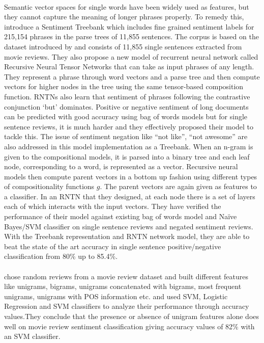\documentclass[a4paper,26pt]{article}
\begin{document}
\paragraph{}
Semantic vector spaces for single words have been widely used as features, but they cannot capture the meaning of longer phrases properly. To remedy this, \cite{socher2013recursive} introduce a Sentiment Treebank which includes fine grained sentiment labels for 215,154 phrases in the parse trees of 11,855 sentences. The corpus is based on the dataset introduced by \cite{pang2005seeing} and consists of 11,855 single sentences extracted from movie reviews. They also propose a new model of recurrent neural network called Recursive Neural Tensor Networks that can take as input phrases of any length. They represent a phrase through word vectors and a parse tree and then compute vectors for higher nodes in the tree using the same tensor-based composition function. RNTNs also learn that sentiment of phrases following the contrastive conjunction ‘but’ dominates. Positive or negative sentiment of long documents can be predicted with good accuracy using bag of words models but for single sentence reviews, it is much harder and they effectively proposed their model to tackle this. The issue of sentiment negation like ``not like'', ``not awesome'' are also addressed in this model implementation as a Treebank. When an n-gram is given to the compositional models, it is parsed into a binary tree and each leaf node, corresponding to a word, is represented as a vector. Recursive neural models then compute parent vectors in a bottom up fashion using different types of compositionality functions $g$. The parent vectors are again given as features to a classifier. In an RNTN that they designed, at each node there is a set of layers each of which interacts with the input vectors. They have verified the performance of their model against existing bag of words model and Na\"{i}ve Bayes/SVM classifier on single sentence reviews and negated sentiment reviews. With the Treebank representation and RNTN network model, they are able to beat the state of the art accuracy in single sentence positive/negative classification from 80\% up to 85.4\%.

\paragraph{}
\cite{pang2002thumbs} chose random reviews from a movie review dataset and built different features like unigrams, bigrams, unigrams concatenated with bigrams, most frequent unigrams, unigrams with POS information etc. and used SVM, Logistic Regression and SVM classifiers to analyze their performance through accuracy values.They conclude that the presence or absence of unigram features alone does well on movie review sentiment classification giving accuracy values of 82\% with an SVM classifier.
\end{document}
